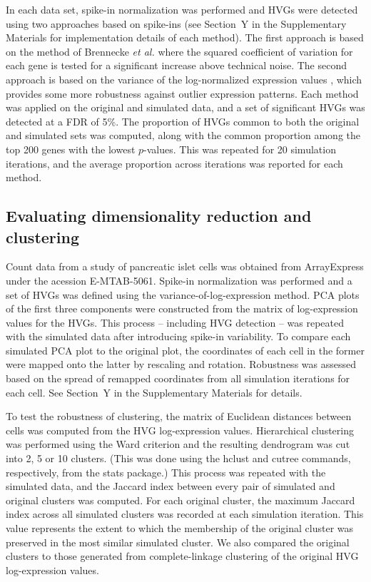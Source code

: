 \documentclass{article}
\begin{document}
In each data set, spike-in normalization was performed and HVGs were detected using two approaches based on spike-ins (see Section~Y in the Supplementary Materials for implementation details of each method).
The first approach is based on the method of Brennecke \textit{et al.} \cite{brennecke2013accounting} where the squared coefficient of variation for each gene is tested for a significant increase above technical noise.
The second approach is based on the variance of the log-normalized expression values \cite{lun2016stepbystep}, which provides some more robustness against outlier expression patterns.
Each method was applied on the original and simulated data, and a set of significant HVGs was detected at a FDR of 5\%.
The proportion of HVGs common to both the original and simulated sets was computed, along with the common proportion among the top 200 genes with the lowest $p$-values.
This was repeated for 20 simulation iterations, and the average proportion across iterations was reported for each method.

\subsection{Evaluating dimensionality reduction and clustering}
Count data from a study of pancreatic islet cells \cite{segerstople2016single} was obtained from ArrayExpress under the acession E-MTAB-5061.
Spike-in normalization was performed and a set of HVGs was defined using the variance-of-log-expression method.
PCA plots of the first three components were constructed from the matrix of log-expression values for the HVGs.
This process -- including HVG detection -- was repeated with the simulated data after introducing spike-in variability.
To compare each simulated PCA plot to the original plot, the coordinates of each cell in the former were mapped onto the latter by rescaling and rotation.
Robustness was assessed based on the spread of remapped coordinates from all simulation iterations for each cell.
See Section~Y in the Supplementary Materials for details.

To test the robustness of clustering, the matrix of Euclidean distances between cells was computed from the HVG log-expression values. 
Hierarchical clustering was performed using the Ward criterion and the resulting dendrogram was cut into 2, 5 or 10 clusters.
(This was done using the hclust and cutree commands, respectively, from the stats package.)
This process was repeated with the simulated data, and the Jaccard index between every pair of simulated and original clusters was computed.
For each original cluster, the maximum Jaccard index across all simulated clusters was recorded at each simulation iteration.
This value represents the extent to which the membership of the original cluster was preserved in the most similar simulated cluster.
We also compared the original clusters to those generated from complete-linkage clustering of the original HVG log-expression values.

{\small


}
\end{document}
